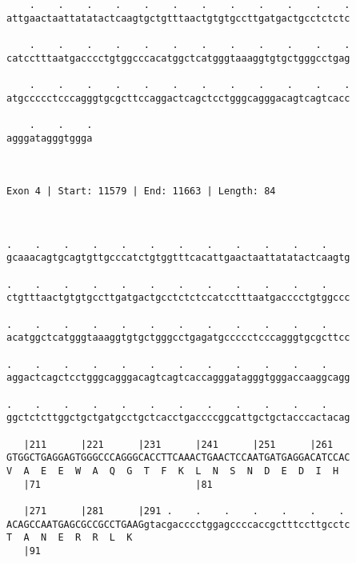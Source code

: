 \documentclass{article}
\begin{document}
\begin{Verbatim}
    .    .    .    .    .    .    .    .    .    .    .    .
attgaactaattatatactcaagtgctgtttaactgtgtgccttgatgactgcctctctc
                                                            
    .    .    .    .    .    .    .    .    .    .    .    .
catcctttaatgacccctgtggcccacatggctcatgggtaaaggtgtgctgggcctgag
                                                            
    .    .    .    .    .    .    .    .    .    .    .    .
atgccccctcccagggtgcgcttccaggactcagctcctgggcagggacagtcagtcacc
                                                            
    .    .    .
agggatagggtggga
               
               
 
Exon 4 | Start: 11579 | End: 11663 | Length: 84



.    .    .    .    .    .    .    .    .    .    .    .    
gcaaacagtgcagtgttgcccatctgtggtttcacattgaactaattatatactcaagtg
                                                            
.    .    .    .    .    .    .    .    .    .    .    .    
ctgtttaactgtgtgccttgatgactgcctctctccatcctttaatgacccctgtggccc
                                                            
.    .    .    .    .    .    .    .    .    .    .    .    
acatggctcatgggtaaaggtgtgctgggcctgagatgccccctcccagggtgcgcttcc
                                                            
.    .    .    .    .    .    .    .    .    .    .    .    
aggactcagctcctgggcagggacagtcagtcaccagggatagggtgggaccaaggcagg
                                                            
.    .    .    .    .    .    .    .    .    .    .    .    
ggctctcttggctgctgatgcctgctcacctgaccccggcattgctgctacccactacag
                                                            
   |211      |221      |231      |241      |251      |261   
GTGGCTGAGGAGTGGGCCCAGGGCACCTTCAAACTGAACTCCAATGATGAGGACATCCAC
V  A  E  E  W  A  Q  G  T  F  K  L  N  S  N  D  E  D  I  H  
   |71                           |81                        
  
   |271      |281      |291 .    .    .    .    .    .    . 
ACAGCCAATGAGCGCCGCCTGAAGgtacgacccctggagccccaccgctttccttgcctc
T  A  N  E  R  R  L  K                                      
   |91                                                      
  

\end{Verbatim}
\end{document}

